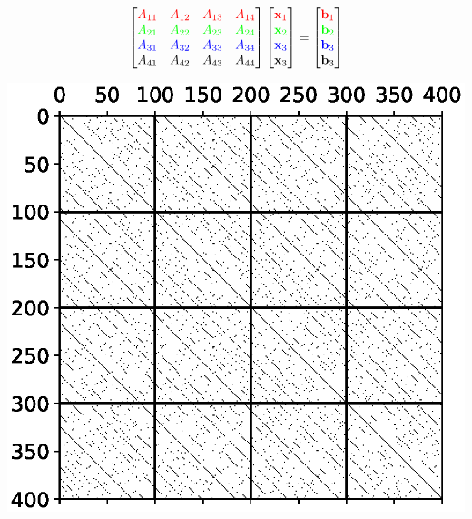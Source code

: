 \documentclass[12pt]{article}
\let\vec\mathbf
\begin{document}
$$
\begin{bmatrix}
	{\color{red} A_{11} } & {\color{red} A_{12} } & {\color{red} A_{13} } & {\color{red} A_{14} }\\
	{\color{green} A_{21} } & {\color{green} A_{22} } & {\color{green} A_{23} } & {\color{green} A_{24} } \\
	{\color{blue} A_{31} } & {\color{blue} A_{32} } & {\color{blue} A_{33} } & {\color{blue} A_{34} } \\
	{\color{black} A_{41} } & {\color{black} A_{42} } & {\color{black} A_{43} } & {\color{black} A_{44} } \\
\end{bmatrix}
\begin{bmatrix}
	{\color{red} \vec{x}_{1} } \\
	{\color{green} \vec{x}_{2} } \\
	{\color{blue} \vec{x}_{3} } \\
	{\color{black} \vec{x}_{3} } 
\end{bmatrix}
=
\begin{bmatrix}
	{\color{red} \vec{b}_{1} } \\
	{\color{green} \vec{b}_{2} } \\
	{\color{blue} \vec{b}_{3} } \\
	{\color{black} \vec{b}_{3} }
	\end{bmatrix}
$$
\begin{center}
	\includegraphics[width=.5\textwidth]{spy_halton_chunked.eps}
\end{center}


\end{document}
